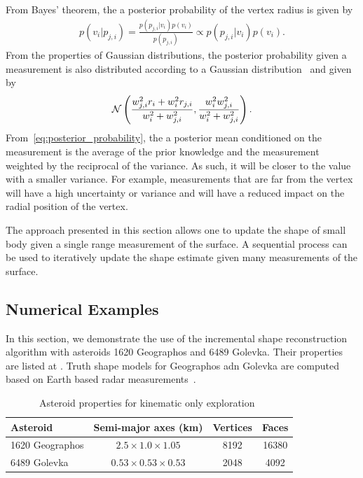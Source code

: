 \documentclass[journal]{new-aiaa}
\begin{document}
From Bayes' theorem, the a posterior probability of the vertex radius is given by
\begin{align}
    p(v_i | p_{j, i}) = \frac{p(p_{j, i} | v_i) p(v_i)}{p( p_{j, i})} \propto p(p_{j,i} | v_i) p(v_i).
\end{align}
From the properties of Gaussian distributions, the posterior probability given a measurement is also distributed according to a Gaussian distribution~\cite{bishop2006} and given by
\begin{align}\label{eq:posterior_probability}
    \mathcal{N} \left( \frac{w_{j, i}^2 r_i + w_i^2 r_{j, i}}{w_i^2 + w_{j, i}^2} , \frac{w_i^2  w_{j, i}^2}{w_i^2 +  w_{j, i}^2} \right) .
\end{align}
From~\cref{eq:posterior_probability}, the a posterior mean conditioned on the measurement is the average of the prior knowledge and the measurement weighted by the reciprocal of the variance. 
As such, it will be closer to the value with a smaller variance. 
For example, measurements that are far from the vertex will have a high uncertainty or variance and will have a reduced impact on the radial position of the vertex.

The approach presented in this section allows one to update the shape of small body given a single range measurement of the surface.
A sequential process can be used to iteratively update the shape estimate given many measurements of the surface. 

\subsection{Numerical Examples}\label{sec:kinematic_exploration}

In this section, we demonstrate the use of the incremental shape reconstruction algorithm with asteroids 1620 Geographos and 6489 Golevka.
Their properties are listed at .
Truth shape models for Geographos adn Golevka are computed based on Earth based radar measurements~\cite{neese2004}.
\begin{table}[htbp]
    \centering
    \begin{tabular}{lccc}
        \toprule
        Asteroid & Semi-major axes (\si{\kilo\meter}) & Vertices & Faces\\
        \midrule
        \num{1620} Geographos & \( 2.5 \times 1.0 \times 1.05 \) & \num{8192} & \num{16380}  \\
        \num{6489} Golevka & \( 0.53 \times 0.53 \times 0.53 \)  & \num{2048} & \num{4092} \\
        \bottomrule
    \end{tabular} 
    \caption{Asteroid properties for kinematic only exploration~\label{tab:kinematic_asteroids}}
\end{table}
\end{document}
